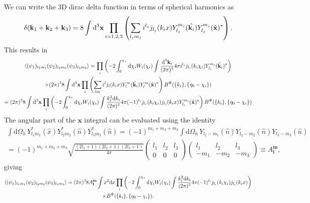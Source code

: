 \documentclass[11pt]{article} %
\DeclareRobustCommand{\d}{\ifmmode\text{d}\else d\fi}
\newcommand{\br}[1]{\ensuremath{\left( #1 \right)}}
\begin{document}
We can write the 3D dirac delta function in terms of spherical harmonics as
\begin{equation*}
    \delta(\mathbf k_1 + \mathbf k_2 + \mathbf k_3) = 8\int\d^3\mathbf x\prod_{i=1,2,3}\br{ \sum_{l_jm_j} i^{l_j}j_{l_j}(k_ix)Y_{l_j}^{m_j}(\hat{\mathbf k_i}) Y_{l_j}^{m_j}(\hat{\mathbf x})^* }.
\end{equation*}
This results in
\begin{gather*}
    \langle (\psi_1)_{l_1m_1}(\psi_2)_{l_2m_2}(\psi_3)_{l_3m_3} \rangle= \prod_i\br{-2\int_0^{\chi_*}\d\chi_i W_i(\chi_i)\int\frac{\d^3\mathbf k_i}{(2\pi)^{3}}4\pi i^{l_i}j_{l_i}(k_i\chi_i)Y_{l_i}^{m_i}(\hat{\mathbf k_i})^*} \\
    \times (2\pi)^38\int\d^3\mathbf x\prod_{i}\br{ \sum_{lm} i^{l}j_{l}(k_ix)Y_{l}^{m}(\hat{\mathbf k_i}) Y_{l}^{m}(\hat{\mathbf x})^* }B^\Psi(\{k_i\}, \{\eta_0-\chi_i\})\\
    = (2\pi)^38\int\d^3\mathbf x\prod_i\br{-2\int_0^{\chi_*}\d\chi_i W_i(\chi_i)\int\frac{k_i^2\d k_i}{(2\pi)^{3}}4\pi (-1)^{l_i}j_{l_i}(k_i\chi_i)j_{l_i}(k_ix) Y_{l_i}^{m_i}(\hat{\mathbf x})^*} B^\Psi(\{k_i\}, \{\eta_0-\chi_i\})
\end{gather*}
The angular part of the $\mathbf x$ integral can be evaluated using the identity
\begin{gather*}
    \int \mathrm{d}\Omega_{\hat{n}} \, Y_{l_1 m_1}^*(\hat{x}) Y_{l_2 m_2}^*(\hat{n}) Y_{l_3 m_3}^*(\hat{n}) = (-1)^{m_1 + m_2 + m_3} 
    \int \mathrm{d}\Omega_{\hat{n}} \, Y_{l_1 -m_1}(\hat{n}) Y_{l_2 -m_2}(\hat{n})Y_{l_3 -m_3}(\hat{n}) \\
    = (-1)^{m_1 + m_2 + m_3} 
    \sqrt{\frac{(2l_1 + 1)(2l_2 + 1)(2l_3 + 1)}{4\pi}} \begin{pmatrix} l_1 & l_2 & l_3 \\ 0 & 0 & 0 \end{pmatrix}
    \begin{pmatrix} l_1 & l_2 & l_3 \\ -m_1 & -m_2 & -m_3 \end{pmatrix} \equiv A_{\mathbf{l}}^{\mathbf{m}},
\end{gather*}
giving
\begin{gather*}
    \langle (\psi_1)_{l_1m_1}(\psi_2)_{l_2m_2}(\psi_3)_{l_3m_3} \rangle 
    = (2\pi)^3 8 A_{\mathbf l}^{\mathbf m}\int x^2\d x\prod_i\br{-2\int_0^{\chi_*}\d\chi_i W_i(\chi_i)\int\frac{k_i^2\d k_i}{(2\pi)^{3}}4\pi (-1)^{l_i}j_{l_i}(k_i\chi_i)j_{l_i}(k_ix)} \\ \times B^\Psi(\{k_i\}, \{\eta_0-\chi_i\}).
\end{gather*}
\end{document}
